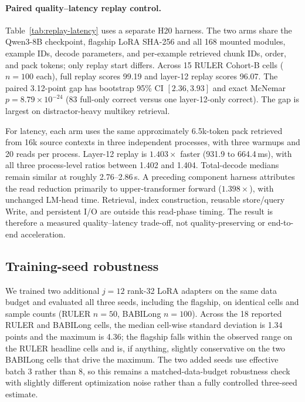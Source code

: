 \paragraph{Paired quality--latency replay control.}
Table~\ref{tab:replay-latency} uses a separate H20 harness. The two arms share
the Qwen3-8B checkpoint, flagship LoRA SHA-256 and all 168 mounted modules,
example IDs, decode parameters, and per-example retrieved chunk IDs, order, and
pack tokens; only replay start differs. Across 15 RULER Cohort-B cells
($n{=}100$ each), full replay scores 99.19 and layer-12 replay scores 96.07.
The paired 3.12-point gap has bootstrap 95\% CI $[2.36,3.93]$ and exact McNemar
$p{=}8.79\!\times\!10^{-24}$ (83 full-only correct versus one layer-12-only
correct). The gap is largest on distractor-heavy multikey retrieval.

For latency, each arm uses the same approximately 6.5k-token pack retrieved from
16k source contexts in three independent
processes, with three warmups and 20 reads per process. Layer-12 replay is
$1.403\times$ faster (931.9 to 664.4\,ms), with all three process-level ratios
between 1.402 and 1.404. Total-decode medians remain similar at roughly
2.76--2.86\,s. A preceding component harness attributes the read reduction
primarily to upper-transformer forward ($1.398\times$), with unchanged LM-head
time. Retrieval, index construction, reusable store/query Write, and persistent
I/O are outside this read-phase timing. The result is therefore a measured
quality--latency trade-off, not quality-preserving or end-to-end acceleration.





\subsection{Training-seed robustness}

We trained two additional $j{=}12$ rank-32 LoRA adapters on the same data budget
and evaluated all three seeds, including the flagship, on identical cells and
sample counts (RULER $n{=}50$, BABILong $n{=}100$). Across the 18 reported RULER
and BABILong cells, the median cell-wise standard deviation is 1.34 points and
the maximum is 4.36; the flagship falls within the observed range on the RULER
headline cells and is, if anything, slightly conservative on the two BABILong
cells that drive the maximum. The two added seeds use effective batch 3 rather
than 8, so this remains a matched-data-budget robustness check with slightly
different optimization noise rather than a fully controlled three-seed estimate.


